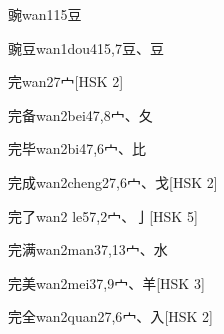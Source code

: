 \begin{EntryWithPhonetic}{豌}{wan1}{15}{⾖}
\end{EntryWithPhonetic}

\begin{EntryWithPhonetic}{豌豆}{wan1dou4}{15,7}{⾖、⾖}
\end{EntryWithPhonetic}

\begin{EntryWithPhonetic}{完}{wan2}{7}{⼧}[HSK 2]
\end{EntryWithPhonetic}

\begin{EntryWithPhonetic}{完备}{wan2bei4}{7,8}{⼧、⼡}
\end{EntryWithPhonetic}

\begin{EntryWithPhonetic}{完毕}{wan2bi4}{7,6}{⼧、⽐}
\end{EntryWithPhonetic}

\begin{EntryWithPhonetic}{完成}{wan2cheng2}{7,6}{⼧、⼽}[HSK 2]
\end{EntryWithPhonetic}

\begin{EntryWithPhonetic}{完了}{wan2 le5}{7,2}{⼧、⼅}[HSK 5]
\end{EntryWithPhonetic}

\begin{EntryWithPhonetic}{完满}{wan2man3}{7,13}{⼧、⽔}
\end{EntryWithPhonetic}

\begin{EntryWithPhonetic}{完美}{wan2mei3}{7,9}{⼧、⽺}[HSK 3]
\end{EntryWithPhonetic}

\begin{EntryWithPhonetic}{完全}{wan2quan2}{7,6}{⼧、⼊}[HSK 2]
\end{EntryWithPhonetic}


